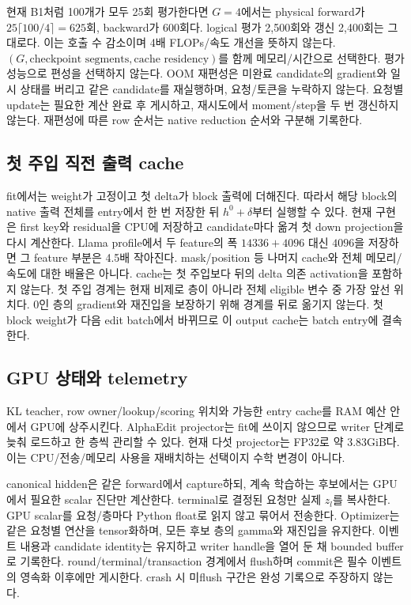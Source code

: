 \documentclass[11pt]{article}
\begin{document}
현재 B1처럼 100개가 모두 25회 평가한다면 $G=4$에서는 physical forward가
$25\lceil100/4\rceil=625$회, backward가 600회다. logical 평가 2,500회와
갱신 2,400회는 그대로다. 이는 호출 수 감소이며 4배 FLOPs/속도 개선을 뜻하지 않는다.
$(G,\text{checkpoint segments},\text{cache residency})$를 함께 메모리/시간으로 선택한다.
평가 성능으로 편성을 선택하지 않는다. OOM 재편성은 미완료 candidate의 gradient와
일시 상태를 버리고 같은 candidate를 재실행하며, 요청/토큰을 누락하지 않는다.
요청별 update는 필요한 계산 완료 후 게시하고, 재시도에서 moment/step을 두 번
갱신하지 않는다. 재편성에 따른 row 순서는 native reduction 순서와 구분해 기록한다.

\subsection{첫 주입 직전 출력 cache}
fit에서는 weight가 고정이고 첫 delta가 block 출력에 더해진다. 따라서 해당
block의 native 출력 전체를 entry에서 한 번 저장한 뒤 $h^0+\delta$부터 실행할 수 있다.
현재 구현은 first key와 residual을 CPU에 저장하고 candidate마다 옮겨
첫 down projection을 다시 계산한다. Llama profile에서 두 feature의 폭
$14336+4096$ 대신 $4096$을 저장하면 그 feature 부분은 4.5배 작아진다.
mask/position 등 나머지 cache와 전체 메모리/속도에 대한 배율은 아니다.
cache는 첫 주입보다 뒤의 delta 의존 activation을 포함하지 않는다.
첫 주입 경계는 현재 비제로 층이 아니라 전체 eligible 변수 중 가장 앞선 위치다.
0인 층의 gradient와 재진입을 보장하기 위해 경계를 뒤로 옮기지 않는다.
첫 block weight가 다음 edit batch에서 바뀌므로 이 output cache는 batch entry에 결속한다.

\subsection{GPU 상태와 telemetry}
KL teacher, row owner/lookup/scoring 위치와 가능한 entry cache를 RAM 예산 안에서
GPU에 상주시킨다. AlphaEdit projector는 fit에 쓰이지 않으므로 writer 단계로
늦춰 로드하고 한 층씩 관리할 수 있다. 현재 다섯 projector는 FP32로 약 3.83GiB다.
이는 CPU/전송/메모리 사용을 재배치하는 선택이지 수학 변경이 아니다.

canonical hidden은 같은 forward에서 capture하되, 계속 학습하는 후보에서는
GPU에서 필요한 scalar 진단만 계산한다. terminal로 결정된 요청만 실제 $z_l$를
복사한다. GPU scalar를 요청/층마다 Python float로 읽지 않고 묶어서 전송한다.
Optimizer는 같은 요청별 연산을 tensor화하며, 모든 후보 층의 gamma와 재진입을 유지한다.
이벤트 내용과 candidate identity는 유지하고 writer handle을 열어 둔 채 bounded buffer로
기록한다. round/terminal/transaction 경계에서 flush하며 commit은 필수 이벤트의
영속화 이후에만 게시한다. crash 시 미flush 구간은 완성 기록으로 주장하지 않는다.
\end{document}
